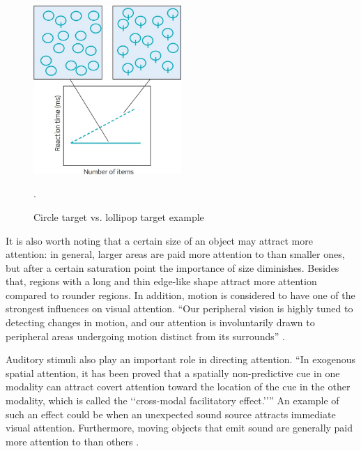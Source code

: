 \begin{figure}[h!]
	\centering
	\includegraphics[width=0.5\textwidth]{figures/circle_lollipop_example.jpg}
	\caption{Circle target vs. lollipop target example \cite{snowden2012basic}}.\label{fig:circle_lollipop_example}
\end{figure}

It is also worth noting that a certain size of an object may attract more attention: in general, larger areas are paid more attention to than smaller ones, but after a certain saturation point the importance of size diminishes. Besides that, regions with a long and thin edge-like shape attract more attention compared to rounder regions. In addition, motion is considered to have one of the strongest influences on visual attention. “Our peripheral vision is highly tuned to detecting changes in motion, and our attention is involuntarily drawn to peripheral areas undergoing motion distinct from its surrounds” \cite{osberger1998automatic}. 


Auditory stimuli also play an important role in directing attention. “In exogenous spatial attention, it has been proved that a spatially non-predictive cue in one modality can attract covert attention toward the location of the cue in the other modality, which is called the ‘‘cross-modal facilitatory effect.’’” An example of such an effect could be when an unexpected sound source attracts immediate visual attention. Furthermore, moving objects that emit sound are generally paid more attention to than others \cite{lee2011efficient}.

